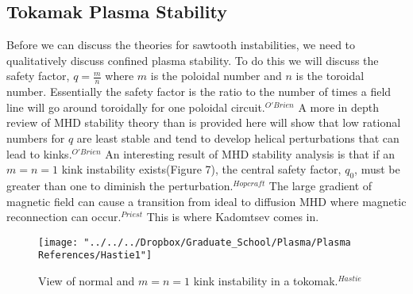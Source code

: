 \documentclass{article}
\begin{document}
\subsection{Tokamak Plasma Stability}
Before we can discuss the theories for sawtooth instabilities, we need to qualitatively discuss confined plasma stability.  To do this we will discuss the safety factor, $q=\frac{m}{n}$ where $m$ is the poloidal number and $n$ is the toroidal number.  Essentially the safety factor is the ratio to the number of times a field line will go around toroidally for one poloidal circuit.$^{O'Brien}$  A more in depth review of MHD stability theory than is provided here will show that low rational numbers for $q$ are least stable and tend to develop helical perturbations that can lead to kinks.$^{O'Brien}$  An interesting result of MHD stability analysis is that if an $m=n=1$ kink instability exists(Figure 7), the central safety factor, $q_0$, must be greater than one to diminish the perturbation.$^{Hopcraft}$  The large gradient of magnetic field can cause a transition from ideal to diffusion MHD where magnetic reconnection can occur.$^{Priest}$  This is where Kadomtsev comes in.
\begin{figure}[h]
\centering
\texttt{[image: "../../../Dropbox/Graduate\_School/Plasma/Plasma References/Hastie1"]}
\caption{View of normal and $m=n=1$ kink instability in a tokomak.$^{Hastie}$}
\label{fig:Hastie1}
\end{figure}
\end{document}
